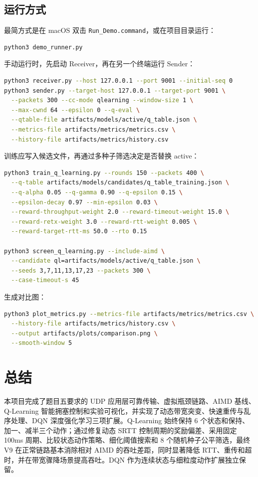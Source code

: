 \documentclass[a4paper, 11pt]{article}
\begin{document}
\subsection{运行方式}
最简方式是在 macOS 双击 \texttt{Run\_Demo.command}，或在项目目录运行：
\begin{lstlisting}[language=bash, caption=一键演示]
python3 demo_runner.py
\end{lstlisting}
手动运行时，先启动 Receiver，再在另一个终端运行 Sender：
\begin{lstlisting}[language=bash, caption=手动运行]
python3 receiver.py --host 127.0.0.1 --port 9001 --initial-seq 0
python3 sender.py --target-host 127.0.0.1 --target-port 9001 \
  --packets 300 --cc-mode qlearning --window-size 1 \
  --max-cwnd 64 --epsilon 0 --q-eval \
  --qtable-file artifacts/models/active/q_table.json \
  --metrics-file artifacts/metrics/metrics.csv \
  --history-file artifacts/metrics/history.csv
\end{lstlisting}
训练应写入候选文件，再通过多种子筛选决定是否替换 active：
\begin{lstlisting}[language=bash, caption=训练与筛选]
python3 train_q_learning.py --rounds 150 --packets 400 \
  --q-table artifacts/models/candidates/q_table_training.json \
  --q-alpha 0.05 --q-gamma 0.90 --q-epsilon 0.15 \
  --epsilon-decay 0.97 --min-epsilon 0.03 \
  --reward-throughput-weight 2.0 --reward-timeout-weight 15.0 \
  --reward-retx-weight 3.0 --reward-rtt-weight 0.005 \
  --reward-target-rtt-ms 50.0 --rto 0.15

python3 screen_q_learning.py --include-aimd \
  --candidate ql=artifacts/models/active/q_table.json \
  --seeds 3,7,11,13,17,23 --packets 300 \
  --case-timeout-s 45
\end{lstlisting}
生成对比图：
\begin{lstlisting}[language=bash, caption=绘图]
python3 plot_metrics.py --metrics-file artifacts/metrics/metrics.csv \
  --history-file artifacts/metrics/history.csv \
  --output artifacts/plots/comparison.png \
  --smooth-window 5
\end{lstlisting}

\section{总结}
本项目完成了题目五要求的 UDP 应用层可靠传输、虚拟瓶颈链路、AIMD 基线、Q-Learning 智能拥塞控制和实验可视化，并实现了动态带宽突变、快速重传与乱序处理、DQN 深度强化学习三项扩展。Q-Learning 始终保持 6 个状态和保持、加一、减半三个动作；通过修复动态 SRTT 控制周期的奖励偏差、采用固定 100ms 周期、比较状态动作策略、细化阈值搜索和 8 个随机种子公平筛选，最终 V9 在正常链路基本消除相对 AIMD 的吞吐差距，同时显著降低 RTT、重传和超时，并在带宽骤降场景提高吞吐。DQN 作为连续状态与细粒度动作扩展独立保留。
\end{document}
